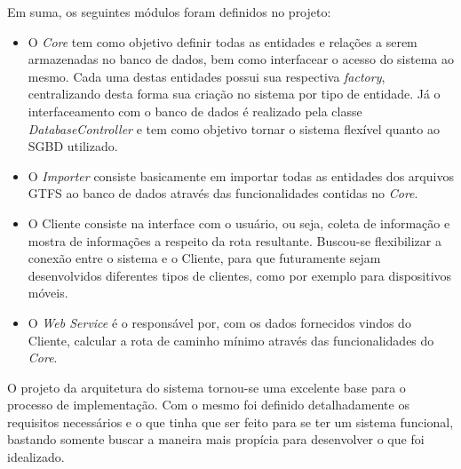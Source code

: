 Em suma, os seguintes módulos foram definidos no projeto:
\begin{itemize}
	\item O \emph{Core} tem como objetivo definir todas as entidades e relações a serem armazenadas no banco de dados, bem como interfacear o acesso do sistema ao mesmo.
			Cada uma destas entidades possui sua respectiva \emph{factory}, centralizando desta forma sua criação no sistema por tipo de entidade.
			Já o interfaceamento com o banco de dados é realizado pela classe \emph{DatabaseController} e tem como objetivo tornar o sistema flexível quanto ao SGBD utilizado.

	\item O \emph{Importer} consiste basicamente em importar todas as entidades dos arquivos GTFS ao banco de dados através das funcionalidades contidas no \emph{Core}.
	\item O Cliente consiste na interface com o usuário, ou seja, coleta de informação e mostra de informações a respeito da rota resultante.
	Buscou-se flexibilizar a conexão entre o sistema e o Cliente, para que futuramente sejam desenvolvidos diferentes tipos de clientes, como por exemplo para dispositivos móveis.
	\item O \emph{Web Service} é o responsável por, com os dados fornecidos vindos do Cliente, calcular a rota de caminho mínimo através das funcionalidades do \emph{Core}.
\end{itemize}

O projeto da arquitetura do sistema tornou-se uma excelente base para o processo de implementação.
Com o mesmo foi definido detalhadamente os requisitos necessários e o que tinha que ser feito para se ter um sistema funcional, bastando somente buscar a maneira mais propícia para desenvolver o que foi idealizado.

